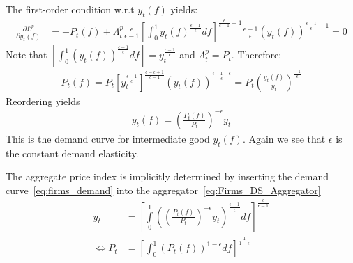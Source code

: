 \begin{enumerate}
The first-order condition w.r.t \(y_t(f)\) yields:
\begin{align}
	\frac{\partial \pounds^{p} }{\partial y_t(f)} & = -P_t(f) + \Lambda_{t}^p \frac{\epsilon}{\epsilon-1} \left[\int_{0}^1 y_t(f)^{\frac{\epsilon-1}{\epsilon}}df\right]^{\frac{\epsilon}{\epsilon-1}-1} \frac{\epsilon-1}{\epsilon} {(y_t(f))}^{\frac{\epsilon-1}{\epsilon}-1} = 0
\label{eq:Firms_Relative_Demand}
\end{align}
Note that \(\left[\int_{0}^1 {(y_t(f))}^{\frac{\epsilon-1}{\epsilon}}df\right] = y_t^{\frac{\epsilon-1}{\epsilon}}\) and \(\Lambda_{t}^p=P_t\).
Therefore:
\begin{align}
	P_t(f) = P_t {\left[y_t^{\frac{\epsilon-1}{\epsilon}}\right]}^{\frac{\epsilon-\epsilon+1}{\epsilon-1}} {(y_t(f))}^{\frac{\epsilon-1-\epsilon}{\epsilon}} = P_t {\left(\frac{y_t(f)}{y_t}\right)}^{\frac{-1}{\epsilon}}
\end{align}
Reordering yields
\begin{align}
	y_t(f) = {\left(\frac{P_t(f)}{P_t}\right)}^{-\epsilon} y_t \label{eq:firms_demand}
\end{align}
This is the demand curve for intermediate good \(y_t(f)\).
Again we see that \(\epsilon \) is the constant demand elasticity.
	
The aggregate price index is implicitly determined by inserting the demand curve~\eqref{eq:firms_demand} into the aggregator~\eqref{eq:Firms_DS_Aggregator}
\begin{align}
	y_t &= {\left[\int\limits_0^1 {\left({\left(\frac{P_t(f)}{P_t}\right)}^{-\epsilon} y_t\right)}^{\frac{\epsilon-1}{\epsilon}}df\right]}^{\frac{\epsilon}{\epsilon-1}}
\\
\Leftrightarrow
	P_t &= {\left[\int_{0}^{1} {(P_t(f))}^{1-\epsilon}df\right]}^{\frac{1}{1-\epsilon}} \label{eq:Firms_DS_Pricing}
\end{align}


\end{enumerate}
